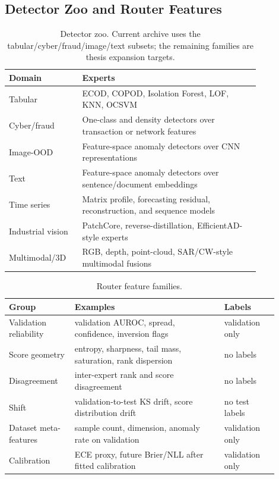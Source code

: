 \documentclass[11pt,titlepage]{article}
\begin{document}
\subsection{Detector Zoo and Router Features}

\begin{table}[H]
\centering
\caption{Detector zoo. Current archive uses the tabular/cyber/fraud/image/text subsets; the remaining families are thesis expansion targets.}
\label{tab:zoo}
\small
\begin{tabular}{L{0.22\linewidth}L{0.62\linewidth}}
\toprule
\textbf{Domain} & \textbf{Experts} \\
\midrule
Tabular & ECOD, COPOD, Isolation Forest, LOF, KNN, OCSVM \\
Cyber/fraud & One-class and density detectors over transaction or network features \\
Image-OOD & Feature-space anomaly detectors over CNN representations \\
Text & Feature-space anomaly detectors over sentence/document embeddings \\
Time series & Matrix profile, forecasting residual, reconstruction, and sequence models \\
Industrial vision & PatchCore, reverse-distillation, EfficientAD-style experts \\
Multimodal/3D & RGB, depth, point-cloud, SAR/CW-style multimodal fusions \\
\bottomrule
\end{tabular}
\end{table}

\begin{table}[H]
\centering
\caption{Router feature families.}
\label{tab:feat}
\small
\begin{tabular}{L{0.22\linewidth}L{0.50\linewidth}L{0.18\linewidth}}
\toprule
\textbf{Group} & \textbf{Examples} & \textbf{Labels} \\
\midrule
Validation reliability & validation AUROC, spread, confidence, inversion flags & validation only \\
Score geometry & entropy, sharpness, tail mass, saturation, rank dispersion & no labels \\
Disagreement & inter-expert rank and score disagreement & no labels \\
Shift & validation-to-test KS drift, score distribution drift & no test labels \\
Dataset meta-features & sample count, dimension, anomaly rate on validation & validation only \\
Calibration & ECE proxy, future Brier/NLL after fitted calibration & validation only \\
\bottomrule
\end{tabular}
\end{table}
\end{document}
